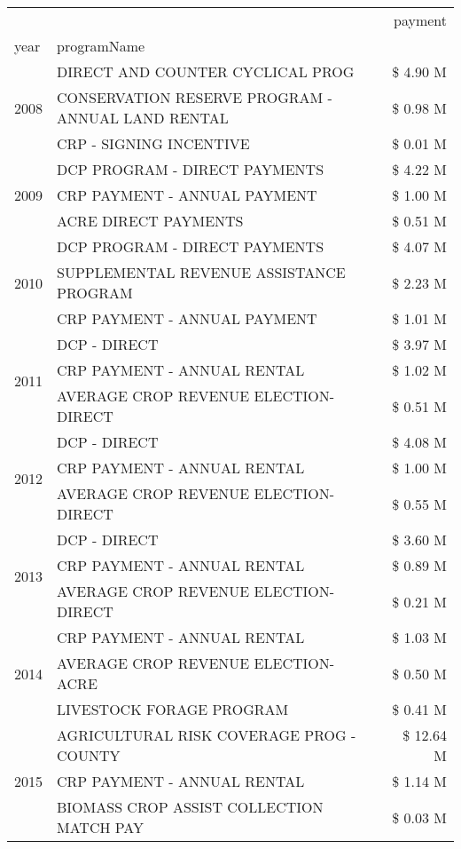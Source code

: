 \begin{tabular}{llr}
\toprule
 &  & payment \\
year & programName &  \\
\midrule
\multirow[t]{3}{*}{2008} & DIRECT AND COUNTER CYCLICAL PROG & \$ 4.90 M \\
 & CONSERVATION RESERVE PROGRAM - ANNUAL LAND RENTAL & \$ 0.98 M \\
 & CRP - SIGNING INCENTIVE & \$ 0.01 M \\
\cline{1-3}
\multirow[t]{3}{*}{2009} & DCP PROGRAM - DIRECT PAYMENTS & \$ 4.22 M \\
 & CRP PAYMENT - ANNUAL PAYMENT & \$ 1.00 M \\
 & ACRE DIRECT PAYMENTS & \$ 0.51 M \\
\cline{1-3}
\multirow[t]{3}{*}{2010} & DCP PROGRAM - DIRECT PAYMENTS & \$ 4.07 M \\
 & SUPPLEMENTAL REVENUE ASSISTANCE PROGRAM & \$ 2.23 M \\
 & CRP PAYMENT - ANNUAL PAYMENT & \$ 1.01 M \\
\cline{1-3}
\multirow[t]{3}{*}{2011} & DCP - DIRECT & \$ 3.97 M \\
 & CRP PAYMENT - ANNUAL RENTAL & \$ 1.02 M \\
 & AVERAGE CROP REVENUE ELECTION-DIRECT & \$ 0.51 M \\
\cline{1-3}
\multirow[t]{3}{*}{2012} & DCP - DIRECT & \$ 4.08 M \\
 & CRP PAYMENT - ANNUAL RENTAL & \$ 1.00 M \\
 & AVERAGE CROP REVENUE ELECTION-DIRECT & \$ 0.55 M \\
\cline{1-3}
\multirow[t]{3}{*}{2013} & DCP - DIRECT & \$ 3.60 M \\
 & CRP PAYMENT - ANNUAL RENTAL & \$ 0.89 M \\
 & AVERAGE CROP REVENUE ELECTION-DIRECT & \$ 0.21 M \\
\cline{1-3}
\multirow[t]{3}{*}{2014} & CRP PAYMENT - ANNUAL RENTAL & \$ 1.03 M \\
 & AVERAGE CROP REVENUE ELECTION-ACRE & \$ 0.50 M \\
 & LIVESTOCK FORAGE PROGRAM & \$ 0.41 M \\
\cline{1-3}
\multirow[t]{3}{*}{2015} & AGRICULTURAL RISK COVERAGE PROG - COUNTY & \$ 12.64 M \\
 & CRP PAYMENT - ANNUAL RENTAL & \$ 1.14 M \\
 & BIOMASS CROP ASSIST COLLECTION MATCH PAY & \$ 0.03 M \\
\cline{1-3}

\end{tabular}
